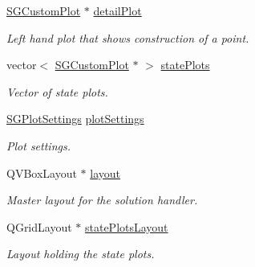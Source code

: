 \begin{DoxyCompactItemize}
\mbox{\label{classSGSolutionHandler__V2_a1d1c5932df16a8339141cfc407d06638}} 
\hyperlink{classSGCustomPlot}{S\+G\+Custom\+Plot} $\ast$ \hyperlink{classSGSolutionHandler__V2_a1d1c5932df16a8339141cfc407d06638}{detail\+Plot}
\begin{DoxyCompactList}\small\item\em Left hand plot that shows construction of a point. \end{DoxyCompactList}\item 
vector$<$ \hyperlink{classSGCustomPlot}{S\+G\+Custom\+Plot} $\ast$ $>$ \hyperlink{classSGSolutionHandler__V2_aea3af246200c2fc2153c3da67a96dcaa}{state\+Plots}
\begin{DoxyCompactList}\small\item\em Vector of state plots. \end{DoxyCompactList}\item 
\mbox{\label{classSGSolutionHandler__V2_af945a817037b8d4ae541f5d3d18911ca}} 
\hyperlink{classSGPlotSettings}{S\+G\+Plot\+Settings} \hyperlink{classSGSolutionHandler__V2_af945a817037b8d4ae541f5d3d18911ca}{plot\+Settings}
\begin{DoxyCompactList}\small\item\em Plot settings. \end{DoxyCompactList}\item 
\mbox{\label{classSGSolutionHandler__V2_a82a72b76e0ec5eec05fbef2d9a52f43f}} 
Q\+V\+Box\+Layout $\ast$ \hyperlink{classSGSolutionHandler__V2_a82a72b76e0ec5eec05fbef2d9a52f43f}{layout}
\begin{DoxyCompactList}\small\item\em Master layout for the solution handler. \end{DoxyCompactList}\item 
\mbox{\label{classSGSolutionHandler__V2_a3db800f1db6856dbb2609aa25e4f8bba}} 
Q\+Grid\+Layout $\ast$ \hyperlink{classSGSolutionHandler__V2_a3db800f1db6856dbb2609aa25e4f8bba}{state\+Plots\+Layout}
\begin{DoxyCompactList}\small\item\em Layout holding the state plots. \end{DoxyCompactList}\item 
\mbox{\label{classSGSolutionHandler__V2_a479a3dc5678c75907ce5db05a85fedf7}} 

\end{DoxyCompactItemize}
